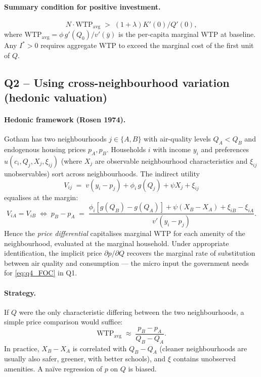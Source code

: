 \documentclass[11pt,a4paper]{article}
\begin{document}
\paragraph{Summary condition for positive investment.}
\begin{equation}
\boxed{\;N\cdot\mathrm{WTP}_{\mathrm{avg}}\;>\;(1+\lambda)K'(0)/Q'(0),\;}
\label{eq:q4_condition}
\end{equation}
where $\mathrm{WTP}_{\mathrm{avg}}=\phi\,g'(Q_{0})/v'(\bar y)$ is the per-capita marginal WTP at baseline. Any $I^{*}>0$ requires aggregate WTP to exceed the marginal cost of the first unit of $Q$.

\subsection*{Q2 -- Using cross-neighbourhood variation (hedonic valuation)}

\paragraph{Hedonic framework (Rosen 1974).}
Gotham has two neighbourhoods $j\in\{A,B\}$ with air-quality levels $Q_{A}<Q_{B}$ and endogenous housing prices $p_{A},p_{B}$. Households $i$ with income $y_{i}$ and preferences $u(c_{i},Q_{j},X_{j},\xi_{ij})$ (where $X_{j}$ are observable neighbourhood characteristics and $\xi_{ij}$ unobservables) sort across neighbourhoods. The indirect utility
\[
V_{ij}\;=\;v(y_{i}-p_{j})+\phi_{i}\,g(Q_{j})+\psi X_{j}+\xi_{ij}
\]
equalises at the margin:
\begin{equation}
V_{iA}=V_{iB}\;\Longleftrightarrow\;p_{B}-p_{A}\;=\;\frac{\phi_{i}[g(Q_{B})-g(Q_{A})]+\psi(X_{B}-X_{A})+\xi_{iB}-\xi_{iA}}{v'(y_{i}-p_{j})}.
\label{eq:q4_hedonic}
\end{equation}
Hence the \emph{price differential} capitalises marginal WTP for each amenity of the neighbourhood, evaluated at the marginal household. Under appropriate identification, the implicit price $\partial p/\partial Q$ recovers the marginal rate of substitution between air quality and consumption --- the micro input the government needs for \eqref{eq:q4_FOC} in Q1.

\paragraph{Strategy.}
If $Q$ were the only characteristic differing between the two neighbourhoods, a simple price comparison would suffice:
\[
\mathrm{WTP}_{\text{avg}}\;\approx\;\frac{p_{B}-p_{A}}{Q_{B}-Q_{A}}.
\]
In practice, $X_{B}-X_{A}$ is correlated with $Q_{B}-Q_{A}$ (cleaner neighbourhoods are usually also safer, greener, with better schools), and $\xi$ contains unobserved amenities. A naïve regression of $p$ on $Q$ is biased.
\end{document}

